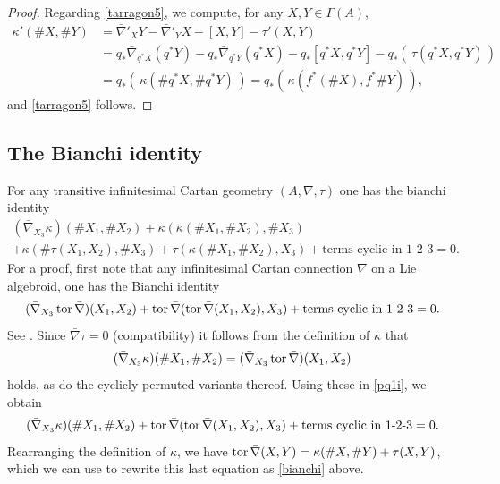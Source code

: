 \documentclass[leqno,12pt]{amsart} %
\begin{document}
\begin{proof}
  Regarding \eqref{tarragon5}, we compute, for any $X, Y \in \Gamma(A)$,
  \begin{align*}
    \kappa'(\#X, \#Y) &= \bar\nabla'_XY - \bar\nabla'_YX - [X, Y] - \tau'(X, Y)\\
                      &= q_*\bar\nabla_{q^*X}(q^*Y) - q_*\bar\nabla_{q^*Y}(q^*X)
                        - q_*[q^*X, q^*Y] - q_*\left(\,\tau(q^*X, q^*Y)\,\right) \\
    &= q_*\left(\,\kappa(\# q^*X, \# q^*Y)\,\right) = q_*\left(\,\kappa(f^*(\# X), f^*\# Y)\,\right),
  \end{align*}
  and \eqref{tarragon5} follows.
\end{proof}

\subsection{The Bianchi identity}\label{section_bianchi_}
For any transitive infinitesimal Cartan geometry $(A, \nabla, \tau)$ one has the {\df
  bianchi identity}
\begin{multline}
  \label{bianchi}
  (\bar\nabla_{X_3}\kappa)(\#X_1, \#X_2) + \kappa (\kappa (\#X_1, \#X_2), \#X_3) \\
   + \kappa(\# \tau(X_1, X_2), \#X_3) + \tau(\kappa(\#X_1, \#X_2), X_3) + \text{terms cyclic in 1-2-3} = 0.
 \end{multline}
For a proof, first note that any infinitesimal Cartan connection
$\nabla $ on a Lie algebroid, one has the Bianchi identity
\begin{equation}
    \label{pq1i}
    (\bar\nabla_{X_3}\operatorname{tor} \bar\nabla )(X_1, X_2) + \operatorname{tor} \bar\nabla
      (\operatorname{tor}    \bar\nabla (X_1, X_2), X_3) + \text{terms cyclic in 1-2-3} = 0.
\end{equation}
See \cite[Example 6.5]{Blaom_12}. Since $\bar\nabla \tau  = 0$
(compatibility) it follows from the definition of $\kappa $ that
\begin{equation*}
  (\bar\nabla_{X_3}\kappa )(\#X_1, \#X_2) = (\bar\nabla_{X_3}\operatorname{tor} \bar\nabla )(X_1, X_2)
\end{equation*}
holds, as do the cyclicly permuted variants thereof. Using these in \eqref{pq1i}, we obtain
\begin{equation*}
  (\bar\nabla_{X_3}\kappa)(\#X_1, \#X_2) + \operatorname{tor} \bar\nabla
  (\operatorname{tor}    \bar\nabla (X_1, X_2), X_3) + \text{terms cyclic in 1-2-3} = 0.
\end{equation*}
Rearranging the definition of $\kappa $, we have
$\operatorname{tor} \bar\nabla(X,Y) = \kappa(\#X, \#Y) + \tau(X, Y)$, which we can use to rewrite
this last equation as \eqref{bianchi} above.
\end{document}
